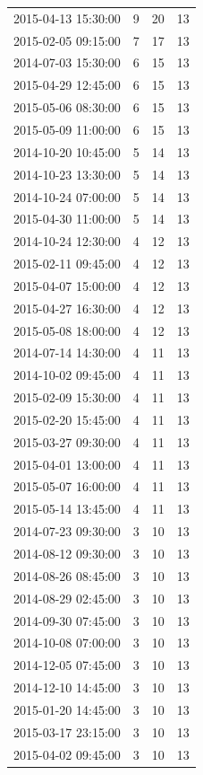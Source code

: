 \begin{tabular}{lrrr}
2015-04-13 15:30:00 & 9 & 20 & 13 \\
2015-02-05 09:15:00 & 7 & 17 & 13 \\
2014-07-03 15:30:00 & 6 & 15 & 13 \\
2015-04-29 12:45:00 & 6 & 15 & 13 \\
2015-05-06 08:30:00 & 6 & 15 & 13 \\
2015-05-09 11:00:00 & 6 & 15 & 13 \\
2014-10-20 10:45:00 & 5 & 14 & 13 \\
2014-10-23 13:30:00 & 5 & 14 & 13 \\
2014-10-24 07:00:00 & 5 & 14 & 13 \\
2015-04-30 11:00:00 & 5 & 14 & 13 \\
2014-10-24 12:30:00 & 4 & 12 & 13 \\
2015-02-11 09:45:00 & 4 & 12 & 13 \\
2015-04-07 15:00:00 & 4 & 12 & 13 \\
2015-04-27 16:30:00 & 4 & 12 & 13 \\
2015-05-08 18:00:00 & 4 & 12 & 13 \\
2014-07-14 14:30:00 & 4 & 11 & 13 \\
2014-10-02 09:45:00 & 4 & 11 & 13 \\
2015-02-09 15:30:00 & 4 & 11 & 13 \\
2015-02-20 15:45:00 & 4 & 11 & 13 \\
2015-03-27 09:30:00 & 4 & 11 & 13 \\
2015-04-01 13:00:00 & 4 & 11 & 13 \\
2015-05-07 16:00:00 & 4 & 11 & 13 \\
2015-05-14 13:45:00 & 4 & 11 & 13 \\
2014-07-23 09:30:00 & 3 & 10 & 13 \\
2014-08-12 09:30:00 & 3 & 10 & 13 \\
2014-08-26 08:45:00 & 3 & 10 & 13 \\
2014-08-29 02:45:00 & 3 & 10 & 13 \\
2014-09-30 07:45:00 & 3 & 10 & 13 \\
2014-10-08 07:00:00 & 3 & 10 & 13 \\
2014-12-05 07:45:00 & 3 & 10 & 13 \\
2014-12-10 14:45:00 & 3 & 10 & 13 \\
2015-01-20 14:45:00 & 3 & 10 & 13 \\
2015-03-17 23:15:00 & 3 & 10 & 13 \\
2015-04-02 09:45:00 & 3 & 10 & 13 \\

\end{tabular}
